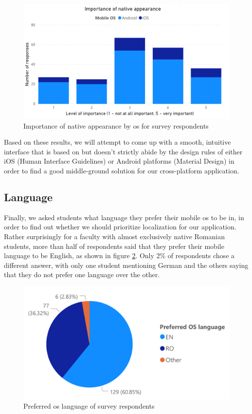 \begin{figure}[ht]
    \centering
         \includegraphics[width=\textwidth]{figures/charts/survey/native_appearance.pdf}
    \caption{Importance of native appearance by \acrshort{os} for survey respondents}
    \label{3:fig:native_appearance}
\end{figure}

Based on these results, we will attempt to come up with a smooth, intuitive interface that is based on but doesn't strictly abide by the design rules of either iOS (Human Interface Guidelines\cite{apple2020human}) or Android platforms (Material Design\cite{google2020material}) in order to find a good middle-ground solution for our cross-platform application.

\subsection{Language} \label{3:language}

Finally, we asked students what language they prefer their mobile \acrshort{os} to be in, in order to find out whether we should prioritize localization for our application. Rather surprisingly for a faculty with almost exclusively native Romanian students, more than half of respondents said that they prefer their mobile language to be English, as shown in figure \ref{3:fig:language}. Only 2\% of respondents chose a different answer, with only one student mentioning German and the others saying that they do not prefer one language over the other.

\begin{figure}[ht]
    \centering
         \includegraphics[height=0.2\textheight]{figures/charts/survey/language.pdf}
    \caption{Preferred \acrshort{os} language of survey respondents}
    \label{3:fig:language}
\end{figure}

